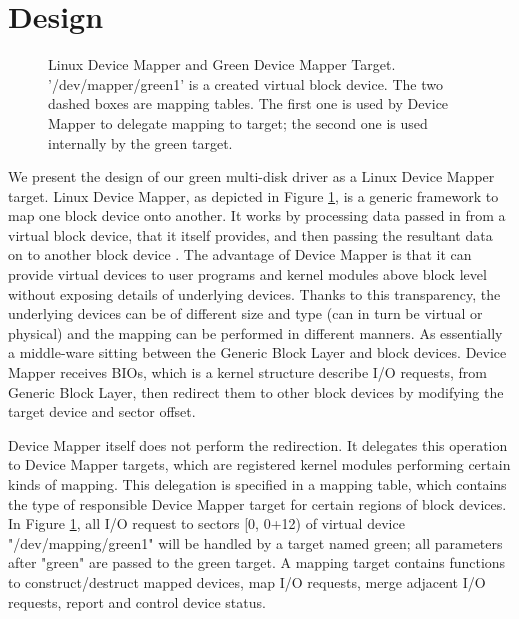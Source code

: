 \section{Design}
\label{sec:design}

\begin{figure}[ht]
\begin{centering}
\caption{Linux Device Mapper and Green Device Mapper Target.
'/dev/mapper/green1' is a created virtual block device. The two dashed
boxes are mapping tables. The first one is used by Device Mapper to
delegate mapping to target; the second one is used internally by the
green target.}
\label{fig:dm}
\end{centering}
\end{figure}

We present the design of our green multi-disk driver as a Linux Device
Mapper target. Linux Device Mapper, as depicted in Figure
\ref{fig:dm}, is a generic framework to map one block device onto
another. It works by processing data passed in from a virtual block
device, that it itself provides, and then passing the resultant data
on to another block device \cite{wiki_dm}. The advantage of Device
Mapper is that it can provide virtual devices to user programs and
kernel modules above block level without exposing details of
underlying devices. Thanks to this transparency, the underlying
devices can be of different size and type (can in turn be virtual or
physical) and the mapping can be performed in different manners. As
essentially a middle-ware sitting between the Generic Block Layer and
block devices. Device Mapper receives BIOs, which is a kernel
structure describe I/O requests, from Generic Block Layer, then
redirect them to other block devices by modifying the target device
and sector offset. 

Device Mapper itself does not perform the redirection. It delegates
this operation to Device Mapper targets, which are registered kernel
modules performing certain kinds of mapping. This delegation is
specified in a mapping table, which contains the type of responsible
Device Mapper target for certain regions of block devices. In Figure
\ref{fig:dm}, all I/O request to sectors [0, 0+12) of virtual device
"/dev/mapping/green1" will be handled by a target named green; all
parameters after "green" are passed to the green target. A mapping
target contains functions to construct/destruct mapped devices, map
I/O requests, merge adjacent I/O requests, report and control device
status.

